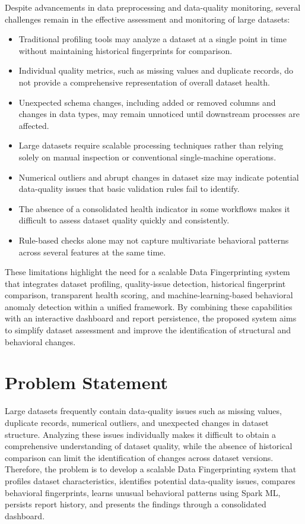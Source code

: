 \documentclass[12pt,a4paper]{report}
\begin{document}
Despite advancements in data preprocessing and data-quality monitoring, several challenges remain in the effective assessment and monitoring of large datasets:
\clearpage
\begin{itemize}
    \item Traditional profiling tools may analyze a dataset at a single point in time without maintaining historical fingerprints for comparison.
    \item Individual quality metrics, such as missing values and duplicate records, do not provide a comprehensive representation of overall dataset health.
    \item Unexpected schema changes, including added or removed columns and changes in data types, may remain unnoticed until downstream processes are affected.
    \item Large datasets require scalable processing techniques rather than relying solely on manual inspection or conventional single-machine operations.
    \item Numerical outliers and abrupt changes in dataset size may indicate potential data-quality issues that basic validation rules fail to identify.
    \item The absence of a consolidated health indicator in some workflows makes it difficult to assess dataset quality quickly and consistently.
    \item Rule-based checks alone may not capture multivariate behavioral patterns across several features at the same time.
\end{itemize}

These limitations highlight the need for a scalable Data Fingerprinting system that integrates dataset profiling, quality-issue detection, historical fingerprint comparison, transparent health scoring, and machine-learning-based behavioral anomaly detection within a unified framework. By combining these capabilities with an interactive dashboard and report persistence, the proposed system aims to simplify dataset assessment and improve the identification of structural and behavioral changes.




\section{Problem Statement}

Large datasets frequently contain data-quality issues such as missing values, duplicate records, numerical outliers, and unexpected changes in dataset structure. Analyzing these issues individually makes it difficult to obtain a comprehensive understanding of dataset quality, while the absence of historical comparison can limit the identification of changes across dataset versions. Therefore, the problem is to develop a scalable Data Fingerprinting system that profiles dataset characteristics, identifies potential data-quality issues, compares behavioral fingerprints, learns unusual behavioral patterns using Spark ML, persists report history, and presents the findings through a consolidated dashboard.
\clearpage
\end{document}
